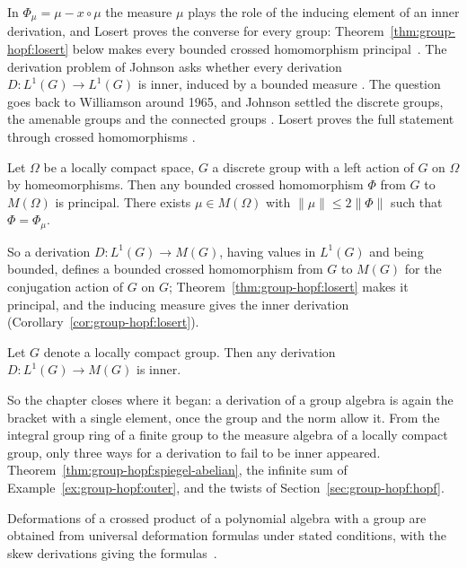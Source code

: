 In $\Phi_\mu=\mu-x\circ\mu$ the measure $\mu$ plays the role of the inducing
element of an inner derivation, and Losert proves the converse for every
group: Theorem~\ref{thm:group-hopf:losert} below makes every bounded crossed
homomorphism principal~\cite[p.~222]{Losert2008}. The derivation problem of Johnson asks whether every
derivation $D\colon L^1(G)\to L^1(G)$ is inner, induced by a bounded measure
\cite[p.~221]{Losert2008}. The question goes back to Williamson around 1965,
and Johnson settled the discrete groups, the amenable groups and the connected
groups \cite[p.~221]{Losert2008}. Losert proves the full statement through
crossed homomorphisms \cite[p.~222]{Losert2008}.

\begin{theorem}\label{thm:group-hopf:losert}
Let $\Omega$ be a locally compact space, $G$ a discrete group with a left action of
$G$ on $\Omega$ by homeomorphisms. Then any bounded crossed homomorphism $\Phi$
from $G$ to $M(\Omega)$ is principal. There exists $\mu\in M(\Omega)$ with
$\|\mu\|\le 2\|\Phi\|$ such that $\Phi=\Phi_\mu$.
\end{theorem}

So a derivation $D\colon L^1(G)\to M(G)$, having values in $L^1(G)$ and being
bounded, defines a bounded crossed homomorphism from $G$ to $M(G)$ for the
conjugation action of $G$ on $G$; Theorem~\ref{thm:group-hopf:losert} makes it
principal, and the inducing measure gives the inner derivation
\cite[p.~222]{Losert2008} (Corollary~\ref{cor:group-hopf:losert}).

\begin{corollary}\label{cor:group-hopf:losert}
Let $G$ denote a locally compact group. Then any derivation
$D\colon L^1(G)\to M(G)$ is inner.
\end{corollary}

So the chapter closes where it began: a derivation of a group algebra is again
the bracket with a single element, once the group and the norm allow it. From
the integral group ring of a finite group to the measure algebra of a locally
compact group, only three ways for a derivation to fail to be inner appeared.
Theorem~\ref{thm:group-hopf:spiegel-abelian}, the infinite sum of
Example~\ref{ex:group-hopf:outer}, and the twists of
Section~\ref{sec:group-hopf:hopf}.

Deformations of a crossed product of a polynomial algebra with a group are
obtained from universal deformation formulas under stated conditions, with the
skew derivations giving the
formulas~\cite{WlSkewDerivationsAndDeformations2019}.
